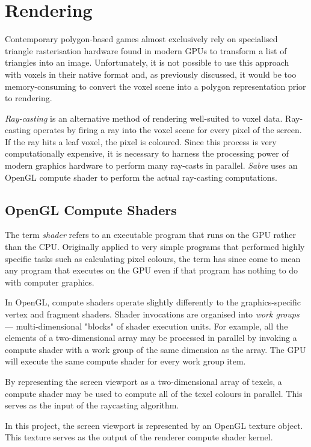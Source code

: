 \chapter{Rendering}

Contemporary polygon-based games almost exclusively rely on specialised triangle rasterisation hardware found in modern GPUs to transform a list of triangles into an image. Unfortunately, it is not possible to use this approach with voxels in their native format and, as previously discussed, it would be too memory-consuming to convert the voxel scene into a polygon representation prior to rendering.

\textit{Ray-casting} is an alternative method of rendering well-suited to voxel data. Ray-casting operates by firing a ray into the voxel scene for every pixel of the screen. If the ray hits a leaf voxel, the pixel is coloured. Since this process is very computationally expensive, it is necessary to harness the processing power of modern graphics hardware to perform many ray-casts in parallel. \textit{Sabre} uses an OpenGL compute shader to perform the actual ray-casting computations.

\section{OpenGL Compute Shaders}
The term \textit{shader} refers to an executable program that runs on the GPU rather than the CPU. Originally applied to very simple programs that performed highly specific tasks such as calculating pixel colours, the term has since come to mean any program that executes on the GPU even if that program has nothing to do with computer graphics.

In OpenGL, compute shaders operate slightly differently to the graphics-specific vertex and fragment shaders. Shader invocations are organised into \textit{work groups} --- multi-dimensional "blocks" of shader execution units. For example, all the elements of a two-dimensional array may be processed in parallel by invoking a compute shader with a work group of the same dimension as the array. The GPU will execute the same compute shader for every work group item.

By representing the screen viewport as a two-dimensional array of texels, a compute shader may be used to compute all of the texel colours in parallel. This serves as the input of the raycasting algorithm.

In this project, the screen viewport is represented by an OpenGL texture object. This texture serves as the output of the renderer compute shader kernel.

